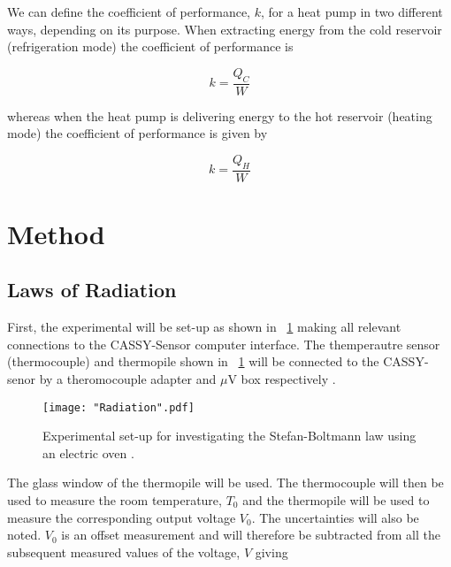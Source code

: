 \documentclass{article}
\newcommand{\figref}[2][\figurename~]{#1\ref{#2}}
\begin{document}
\vspace{2mm}
\noindent
We can define the coefficient of performance, $k$, for a heat pump in two different ways, depending on its purpose. When extracting energy from the cold reservoir (refrigeration mode) the coefficient of performance is

\begin{equation}
\label{eq:Rerigeration}
k = \frac{Q_C}{W}
\end{equation}

\vspace{2mm}
\noindent
whereas when the heat pump is delivering energy to the hot reservoir (heating mode) the coefficient of performance is given by

\begin{equation}
\label{eq:Heating}
k = \frac{Q_H}{W}
\end{equation}

 
\section{Method}
\label{sec:method}

\subsection{Laws of Radiation}
\label{ssec:radiaton-method}

First, the experimental will be set-up as shown in \figref{fig:radiation} \cite{Paper01} making all relevant connections to the CASSY-Sensor computer interface. The themperautre sensor (thermocouple) and thermopile shown in \figref{fig:radiation} will be connected to the CASSY-senor by a theromocouple adapter and $\mu$V box respectively \cite{Paper01}. 

\begin{figure}[h]
\centering
\texttt{[image: "Radiation".pdf]}
\caption{Experimental set-up for investigating the Stefan-Boltmann law using an electric oven \cite{Paper01}.}
\label{fig:radiation}
\end{figure}

\vspace{2mm}
\noindent
The glass window of the thermopile will be used. The thermocouple will then be used to measure the room temperature, $T_0$ and the thermopile will be used to measure the corresponding output voltage $V_0$. The uncertainties will also be noted. $V_0$ is an offset measurement and will therefore be subtracted from all the subsequent measured values of the voltage, $V$ \cite{Paper01} giving
\end{document}
